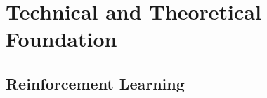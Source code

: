 \usepackage{hyperref}

%
%

\chapter{Technical and Theoretical Foundation}
\label{chap.grundlagen}
\section{Reinforcement Learning}\label{reinforcementlearning}
